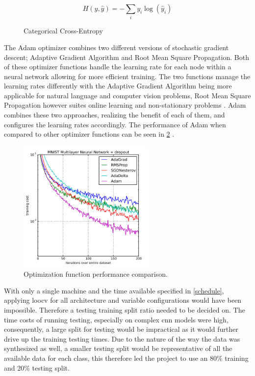 \documentclass[12pt]{article}
\begin{document}
\begin{figure}[H]
\[ H(y, \hat{y}) = -\sum_{i} y_i \log(\hat{y}_i)  \]
\caption{Categorical Cross-Entropy}
\label{eq:cat-ce}
\end{figure}

The Adam optimizer combines two different versions of stochastic gradient descent; Adaptive Gradient Algorithm and Root Mean Square Propagation. Both of these optimizer functions handle the learning rate for each node within a neural network allowing for more efficient training. The two functions manage the learning rates differently with the Adaptive Gradient Algorithm being more applicable for natural language and computer vision problems, Root Mean Square Propagation however suites online learning and non-stationary problems \cite{brownlee2021adam}. Adam combines these two approaches, realizing the benefit of each of them, and configures the learning rates accordingly. The performance of Adam when compared to other optimizer functions can be seen in \ref{fig:adam} \cite{brownlee2021adam}.


\begin{figure}[H]
\includegraphics[width=0.6\textwidth]{adam}
\centering
\caption{Optimization function performance comparison.}
\label{fig:adam}
\end{figure}


With only a single machine and the time available specified in \ref{schedule}, applying \acrfull{loocv} for all architecture and variable configurations would have been impossible. Therefore a testing training split ratio needed to be decided on. The time costs of running testing, especially on complex \acrshort{cnn} models were high, consequently, a large split for testing would be impractical as it would further drive up the training testing times. Due to the nature of the way the data was synthesized as well, a smaller testing split would be representative of all the available data for each class, this therefore led the project to use an 80\% training and 20\% testing split. 
\end{document}
